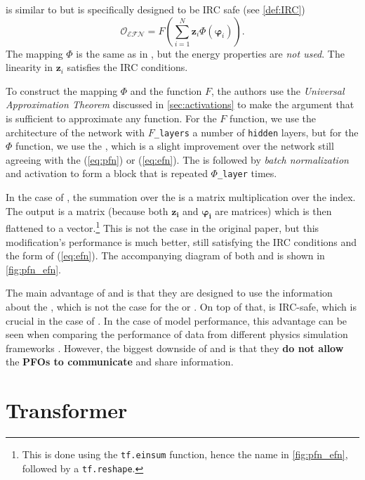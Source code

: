 \EFN is similar to \PFN but is specifically designed to be IRC safe (see \cref{def:IRC})
\begin{equation}
    \label{eq:efn}
    \mathcal{O_{\text{EFN}}} = F\left(\sum_{i=1}^N \pmb{z}_i \Phi(\pmb{\varphi}_i )\right).
\end{equation}
The mapping $\Phi$ is the same as in \PFN, but the \PFO energy properties are \emph{not used}. 
The linearity in $\pmb{z}_i$ satisfies the IRC conditions.

To construct the mapping $\Phi$ and the function $F$, the authors \cite{efn} use the \emph{Universal Approximation Theorem} \cite{universal_app_thm} discussed in \cref{sec:activations} to make the argument that \fc is sufficient to approximate any function.
For the $F$ function, we use the architecture of the \fc network with \texttt{$F$\_layers} a number of \texttt{hidden} layers, but for the $\Phi$ function, we use the \pointCNN \cite{pointCNN}, which is a slight improvement over the \fc network still agreeing with the (\ref{eq:pfn}) or (\ref{eq:efn}).
The \pointCNN is followed by \emph{batch normalization} and activation to form a block that is repeated \texttt{$\Phi$\_layer} times.

In the case of \EFN, the summation over the \PFOs is a matrix multiplication over the \PFO index. 
The output is a matrix (because both $\pmb{z_i}$ and $\pmb{\varphi_i}$ are matrices) which is then flattened to a vector.\footnote{This is done using the \texttt{tf.einsum} function, hence the name in \cref{fig:pfn_efn}, followed by a \texttt{tf.reshape}.}
This is not the case in the original paper, but this modification's performance is much better, still satisfying the IRC conditions and the form of (\ref{eq:efn}).
The accompanying diagram of both \PFN and \EFN is shown in \cref{fig:pfn_efn}.


The main advantage of \PFN and \EFN is that they are designed to use the information about the \PFOs, which is not the case for the \fc or \highway.
On top of that, \EFN is IRC-safe, which is crucial in the case of \HEP.
In the case of model performance, this advantage can be seen when comparing the performance of data from different physics simulation frameworks \cite{top_tag}.
However, the biggest downside of \PFN and \EFN is that they \textbf{do not allow} the \textbf{PFOs to communicate} and share information.

\section{Transformer}
\label{sec:transformer}

